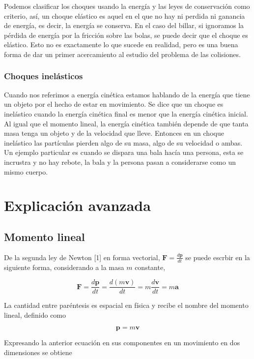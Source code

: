 \documentclass{article}
\begin{document}
Podemos clasificar los choques usando la energía y las leyes de conservación como criterio, así, un choque elástico es aquel  en el que no hay ni perdida ni ganancia de energía, es decir, la energía se conserva. En el caso del billar, si ignoramos la pérdida de energía por la fricción sobre las bolas, se puede decir que el choque es elástico. Esto no es exactamente lo que sucede en realidad, pero es una buena forma de dar un primer acercamiento al estudio del problema de las colisiones.

\subsubsection{Choques inelásticos}
Cuando nos referimos a energía cinética estamos hablando de la energía que tiene un objeto por el hecho de estar en movimiento.
Se dice que un choque es inelástico cuando la energía  cinética final es menor que la energía cinética inicial. Al igual que el momento lineal, la energía cinética también depende de que tanta masa tenga un objeto y de la velocidad que lleve. Entonces en un choque inelástico las partículas pierden algo de su masa, algo de su velocidad o ambas. Un ejemplo particular es cuando se dispara una bala hacía una persona, esta se incrustra y no hay rebote, la bala y la persona pasan a considerarse como un mismo cuerpo.

\section{Explicación avanzada}
\subsection{Momento lineal}
De la segunda ley de Newton [1] en forma vectorial, $\textbf{F}=\frac{d\textbf{p}}{dt}$ se puede escrbir en la siguiente forma, considerando a la masa $m$ constante,

\begin{equation}
   \textbf{F}=\frac{d\textbf{p}}{dt}=\frac{d(m\textbf{v})}{dt}=m\frac{d\textbf{v}}{dt}=m\textbf{a}
\end{equation}

La cantidad entre paréntesis es espacial en física y recibe el nombre del momento lineal, definido como

\begin{equation}
   \textbf{p}=m\textbf{v}
\end{equation}

Expresando la anterior ecuación en sus componentes en un movimiento en dos dimensiones se obtiene
\end{document}
